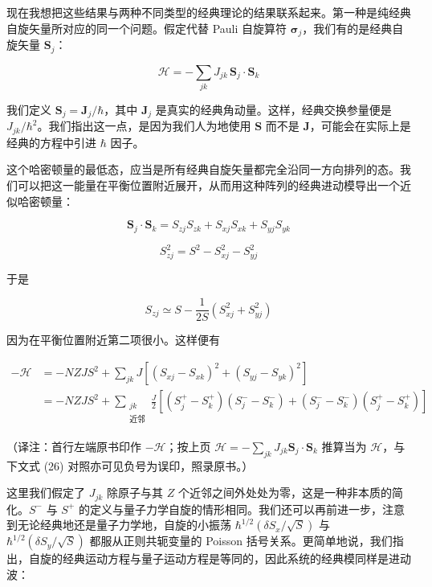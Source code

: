 现在我想把这些结果与两种不同类型的经典理论的结果联系起来。第一种是纯经典自旋矢量所对应的同一个问题。假定代替 Pauli 自旋算符 $\boldsymbol{\sigma}_{j}$，我们有的是经典自旋矢量 $\mathbf{S}_{j}$：

\begin{equation*}
\mathcal{H} = -\sum_{jk} J_{jk}\,\mathbf{S}_{j}\cdot\mathbf{S}_{k}
\end{equation*}

我们定义 $\mathbf{S}_{j} = \mathbf{J}_{j}/\hbar$，其中 $\mathbf{J}_{j}$ 是真实的经典角动量。这样，经典交换参量便是 $J_{jk}/\hbar^{2}$。我们指出这一点，是因为我们人为地使用 $\mathbf{S}$ 而不是 $\mathbf{J}$，可能会在实际上是经典的方程中引进 $\hbar$ 因子。

这个哈密顿量的最低态，应当是所有经典自旋矢量都完全沿同一方向排列的态。我们可以把这一能量在平衡位置附近展开，从而用这种阵列的经典进动模导出一个近似哈密顿量：

\begin{equation*}
\mathbf{S}_{j}\cdot\mathbf{S}_{k} = S_{zj}S_{zk} + S_{xj}S_{xk} + S_{yj}S_{yk}
\end{equation*}

\begin{equation*}
S_{zj}^{2} = S^{2} - S_{xj}^{2} - S_{yj}^{2}
\end{equation*}

于是

\begin{equation*}
S_{zj} \simeq S - \frac{1}{2S}\left(S_{xj}^{2} + S_{yj}^{2}\right)
\end{equation*}

因为在平衡位置附近第二项很小。这样便有

\begin{align*}
-\mathcal{H} &= -NZJS^{2} + \sum_{jk} J\left[\left(S_{xj} - S_{xk}\right)^{2} + \left(S_{yj} - S_{yk}\right)^{2}\right] \\
&= -NZJS^{2} + \sum_{\substack{jk \\ \text{近邻}}} \frac{J}{2}\left[\left(S^{+}_{j} - S^{+}_{k}\right)\left(S^{-}_{j} - S^{-}_{k}\right) + \left(S^{-}_{j} - S^{-}_{k}\right)\left(S^{+}_{j} - S^{+}_{k}\right)\right]
\end{align*}

（译注：首行左端原书印作 $-\mathcal{H}$；按上页 $\mathcal{H} = -\sum_{jk}J_{jk}\mathbf{S}_{j}\cdot\mathbf{S}_{k}$ 推算当为 $\mathcal{H}$，与下文式 (26) 对照亦可见负号为误印，照录原书。）

这里我们假定了 $J_{jk}$ 除原子与其 $Z$ 个近邻之间外处处为零，这是一种非本质的简化。$S^{-}$ 与 $S^{+}$ 的定义与量子力学自旋的情形相同。我们还可以再前进一步，注意到无论经典地还是量子力学地，自旋的小振荡 $\hbar^{1/2}(\delta S_{x}/\sqrt{S})$ 与 $\hbar^{1/2}(\delta S_{y}/\sqrt{S})$ 都服从正则共轭变量的 Poisson 括号关系。更简单地说，我们指出，自旋的经典运动方程与量子运动方程是等同的，因此系统的经典模同样是进动波：


